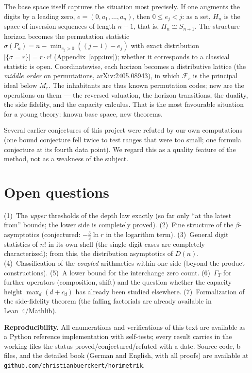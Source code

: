 \documentclass[11pt]{article}
\theoremstyle{definition}
\theoremstyle{remark}
\begin{document}
The base space itself captures the situation most precisely. If one
augments the digits by a leading zero, $e=(0,a_1,\dots,a_n)$, then
$0\le e_j<j$: as a set, $H_n$ is the space of inversion sequences
of length $n{+}1$, that is, $H_n\cong S_{n+1}$. The structure
horizon becomes the permutation statistic
$\sigma(P_a)=n-\min_{e_j>0}((j{-}1)-e_j)$ with exact distribution
$|\{\sigma=r\}|=r\cdot r!$ (Appendix~\ref{app:inv}); whether it corresponds to a classical
statistic is open. Coordinatewise, each horizon becomes a
distributive lattice (the \emph{middle order} on permutations,
arXiv:2405.08943), in which $\mathcal F_r$ is the principal ideal
below $M_r$. The inhabitants are thus known permutation codes; new
are the operations on them --- the reversed valuation, the horizon
transitions, the duality, the side fidelity, and the capacity
calculus. That is the most favourable situation for a young theory:
known base space, new theorems.

Several earlier conjectures of this project were refuted by our own
computations (one bound conjecture fell twice to test ranges that
were too small; one formula conjecture at its fourth data point).
We regard this as a quality feature of the method, not as a
weakness of the subject.

\section{Open questions}

(1)~The \emph{upper} thresholds of the depth law exactly (so far
only ``at the latest from'' bounds; the lower side is completely
proved). (2)~Fine structure of the $\beta$-asymptotics (conjectured:
$-\tfrac32\ln r$ in the logarithm term). (3)~General digit
statistics of $n!$ in its own shell (the single-digit cases are
completely characterized); from this, the distribution asymptotics
of $D(n)$. (4)~Classification of the \emph{coupled} arithmetics
within one side (beyond the product constructions).
(5)~A lower bound for the interchange zero count.
(6)~$\Gamma_T$ for further operators (composition, shift) and the
question whether the capacity height $\max_d(d+c_d)$ has already
been studied elsewhere. (7)~Formalization of the side-fidelity
theorem (the falling factorials are already available in
Lean~4/Mathlib).

\bigskip
\noindent\textbf{Reproducibility.} All enumerations and
verifications of this text are available as a Python reference
implementation with self-tests; every result carries in the working
files the status proved/conjectured/refuted with a date. Source
code, b-files, and the detailed book (German and English, with all
proofs) are available at
\texttt{github.com/}\allowbreak\texttt{christianbuerckert/horimetrik}.
\end{document}
